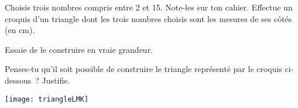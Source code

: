 
\begin{activite}

\begin{partie}
Choisis trois nombres compris entre 2 et 15. Note-les sur ton cahier. Effectue un croquis d'un triangle dont les trois nombres choisis sont les mesures de ses côtés (en cm).
\end{partie}

\begin{partie}
Essaie de le construire en vraie grandeur.
\end{partie}

\begin{partie}
Penses-tu qu'il soit possible de construire le triangle représenté par le croquis ci-dessous ? Justifie.

\begin{center} \texttt{[image: triangleLMK]} \end{center}
\end{partie}

\end{activite}


